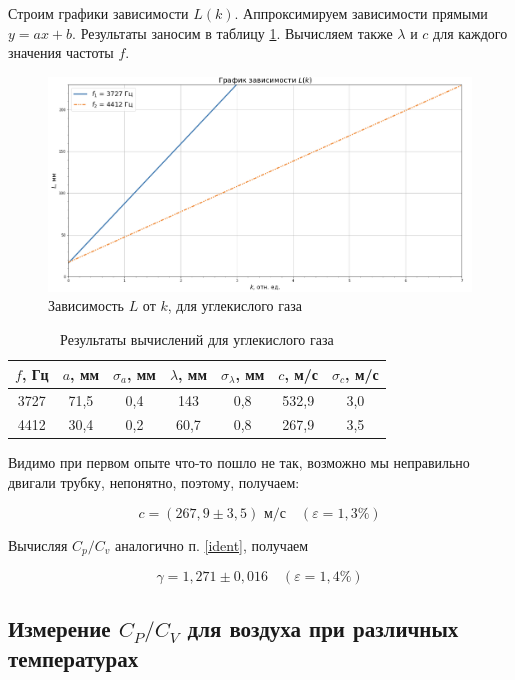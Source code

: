 \documentclass[a4paper,12pt]{article}
\theoremstyle{definition}
\begin{document}
	Строим графики зависимости $ L(k) $. Аппроксимируем зависимости прямыми $ y=ax+b $. Результаты заносим в таблицу \ref{tab:resCO2}. Вычисляем также $ \lambda $ и $ c $ для каждого значения частоты $ f $.
	
	\begin{figure}[h!]
		\centering
		\includegraphics[scale=0.542]{graph3}
		\caption{Зависимость $ L $ от $ k $, для углекислого газа}
		\label{graph2}
	\end{figure}
	
	\begin{table}[H]
		\centering
		\begin{tabular}{|c|c|c|c|c|c|c|}
			\hline
			$ f $, Гц & $ a $, мм & $ \sigma_a $, мм & $ \lambda $, мм & $ \sigma_\lambda $, мм & $ c $, м/с & $ \sigma_c $, м/с \\ \hline
			3727 & 71,5 & 0,4 & 143 & 0,8 & 532,9 & 3,0 \\ \hline
			4412 & 30,4 & 0,2 & 60,7 & 0,8 & 267,9 & 3,5 \\ \hline
		\end{tabular}
		\caption{Результаты вычислений для углекислого газа}
		\label{tab:resCO2}
	\end{table}

	
	Видимо при первом опыте что-то пошло не так, возможно мы неправильно двигали трубку, непонятно, поэтому, получаем:
	
	\[ \boxed{c=(267,9 \pm 3,5)  \text{ м/с}} \quad (\varepsilon=1,3\%)\]
	
	Вычисляя $ C_p/C_v $ аналогично п. \ref{ident}, получаем
	
	\[ \boxed{\gamma = 1,271 \pm 0,016}\quad (\varepsilon=1,4\%) \]
	
	\subsection{Измерение $ C_P/C_V $ для воздуха при различных температурах}
	
\end{document}
